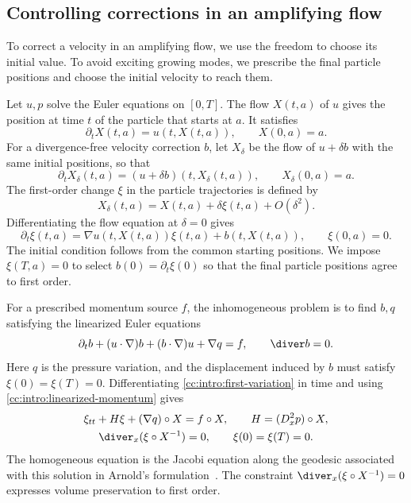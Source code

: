 \subsection{Controlling corrections in an amplifying flow}
To correct a velocity in an amplifying flow, we use the freedom to choose
its initial value. To avoid exciting growing modes, we prescribe the final
particle positions and choose the initial velocity to reach them.

Let $u,p$ solve the Euler equations on $[0,T]$. The flow $X(t,a)$ of
$u$ gives the position at time $t$ of the particle that starts at $a$.
It satisfies
\[
 \partial_tX(t,a)=u(t,X(t,a)),\qquad X(0,a)=a.
\]
For a divergence-free velocity correction $b$, let $X_\delta$ be the
flow of $u+\delta b$ with the same initial positions, so that
\[
 \partial_tX_\delta(t,a)
       =(u+\delta b)(t,X_\delta(t,a)),\qquad X_\delta(0,a)=a.
\]
The first-order change $\xi$ in the particle trajectories is defined by
\[
 X_\delta(t,a)=X(t,a)+\delta\xi(t,a)+O(\delta^2).
\]
Differentiating the flow equation at $\delta=0$ gives
\begin{equation}\label{cc:intro:first-variation}
 \partial_t\xi(t,a)=\nabla u(t,X(t,a))\xi(t,a)+b(t,X(t,a)),
 \qquad \xi(0,a)=0.
\end{equation}
The initial condition follows from the common starting positions.
We impose $\xi(T,a)=0$ to select $b(0)=\partial_t\xi(0)$ so that the final
particle positions agree to first order.

For a prescribed momentum source $f$, the inhomogeneous problem is to
find $b,q$ satisfying the linearized Euler equations
\begin{equation}\label{cc:intro:linearized-momentum}
 \partial_t b+(u\cdot\nabla)b+(b\cdot\nabla)u+\nabla q=f,
 \qquad \diver b=0.
\end{equation}
Here $q$ is the pressure variation, and the displacement induced by $b$
must satisfy $\xi(0)=\xi(T)=0$. Differentiating
\eqref{cc:intro:first-variation} in time and using
\eqref{cc:intro:linearized-momentum} gives
\begin{equation}\label{cc:intro:jacobi}
 \begin{gathered}
 \xi_{tt}+H\xi+(\nabla q)\circ X=f\circ X,
 \qquad H=(D_x^2p)\circ X,\\
 \diver_x(\xi\circ X^{-1})=0,\qquad \xi(0)=\xi(T)=0.
 \end{gathered}
\end{equation}
The homogeneous equation is the Jacobi equation along the geodesic
associated with this solution in Arnold's formulation~\cite{Arnold1966}.
The constraint $\diver_x(\xi\circ X^{-1})=0$ expresses volume
preservation to first order.

